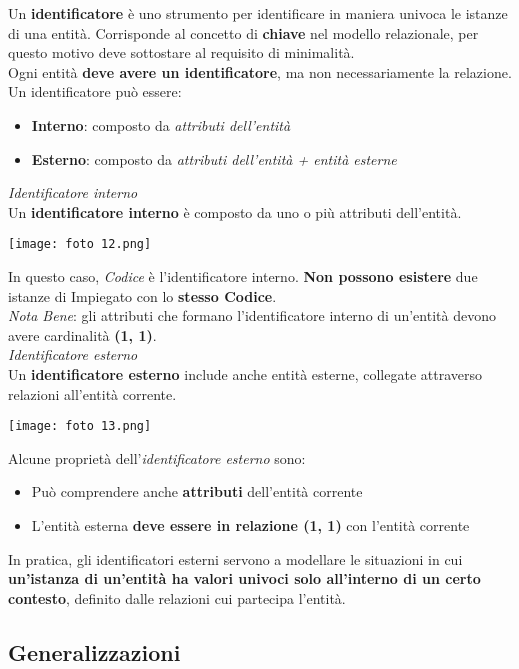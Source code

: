\documentclass{article}
\begin{document}
Un \textbf{identificatore} è uno strumento per identificare in maniera univoca le istanze di una entità. Corrisponde al concetto di \textbf{chiave} nel modello relazionale, per questo motivo deve sottostare al requisito di minimalità.\\
Ogni entità \textbf{deve avere un identificatore}, ma non necessariamente la relazione. Un identificatore può essere:
\begin{itemize}[label={-}, leftmargin=1cm]
    \item \textbf{Interno}: composto da \textit{attributi dell'entità}
    \item \textbf{Esterno}: composto da \textit{attributi dell'entità + entità esterne}\\
\end{itemize}
\textit{Identificatore interno}\\
Un \textbf{identificatore interno} è composto da uno o più attributi dell'entità.
\begin{center}
    \texttt{[image: foto 12.png]}
\end{center}
In questo caso, \textit{Codice} è l'identificatore interno. \textbf{Non possono esistere} due istanze di Impiegato con lo \textbf{stesso Codice}.\\
\textit{Nota Bene}: gli attributi che formano l'identificatore interno di un'entità devono avere cardinalità \textbf{(1, 1)}.\vspace{110pt}\\
\textit{Identificatore esterno}\\
Un \textbf{identificatore esterno} include anche entità esterne, collegate attraverso relazioni all'entità corrente.
\begin{center}
    \texttt{[image: foto 13.png]}
\end{center}
Alcune proprietà dell'\textit{identificatore esterno} sono:
\begin{itemize}[label={-}, leftmargin=1cm]
    \item Può comprendere anche \textbf{attributi} dell'entità corrente
    \item L'entità esterna \textbf{deve essere in relazione (1, 1)} con l'entità corrente
\end{itemize}
In pratica, gli identificatori esterni servono a modellare le situazioni in cui \textbf{un'istanza di un'entità ha valori univoci solo all'interno di un certo contesto}, definito dalle relazioni cui partecipa l'entità.

\subsection*{Generalizzazioni}
\large
\end{document}
